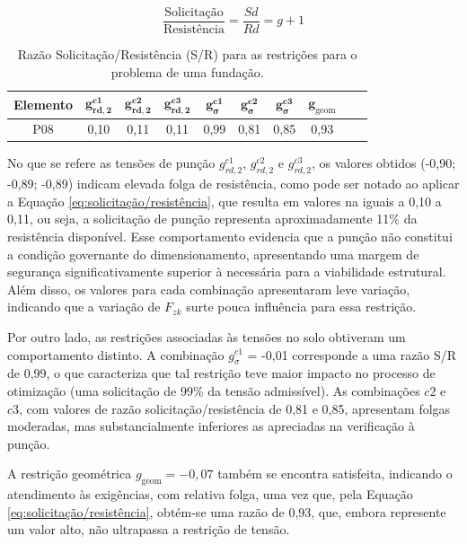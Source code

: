 \begin{equation}
    \label{eq:solicitação/resistência}
    \frac{\text{Solicitação}}{\text{Resistência}} = \frac{Sd}{Rd} = g + 1
\end{equation}

\begin{table}[htpb!]
\centering
\caption{Razão Solicitação/Resistência (S/R) para as restrições para o problema de uma fundação.}
\label{tab:S/R_uma_fundação}
\begin{tabular}{cccccccccc}
\toprule
\textbf{Elemento} &
$\mathbf{g_{rd,2}^{c1}}$ &
$\mathbf{g_{rd,2}^{c2}}$ &
$\mathbf{g_{rd,2}^{c3}}$ &
$\mathbf{g_{\sigma}^{c1}}$ &
$\mathbf{g_{\sigma}^{c2}}$ &
$\mathbf{g_{\sigma}^{c3}}$ &
$\mathbf{g_{\mathrm{geom}}}$ \\
\midrule
P08 & 0,10	& 0,11	& 0,11	& 0,99	& 0,81	& 0,85	& 0,93 \\
\bottomrule
\end{tabular}
\end{table}

No que se refere as tensões de punção $g_{rd,2}^{c1}$, $g_{rd,2}^{c2}$ e $g_{rd,2}^{c3}$, os valores obtidos (-0,90; -0,89; -0,89) indicam elevada folga de resistência, como pode ser notado ao aplicar a Equação \eqref{eq:solicitação/resistência}, que resulta em valores na iguais a 0,10 a 0,11, ou seja, a solicitação de punção representa aproximadamente 11\% da resistência disponível. Esse comportamento evidencia que a punção não constitui a condição governante do dimensionamento, apresentando uma margem de segurança significativamente superior à necessária para a viabilidade estrutural. Além disso, os valores para cada combinação apresentaram leve variação, indicando que a variação de $F_{zk}$ surte pouca influência para essa restrição. 

Por outro lado, as restrições associadas às tensões no solo obtiveram um comportamento distinto. A combinação $g_{\sigma}^{c1}$ = -0,01 corresponde a uma razão S/R de 0,99, o que caracteriza que tal restrição teve maior impacto no processo de otimização (uma solicitação de 99\% da tensão admissível). As combinações $c2$ e $c3$, com valores de razão solicitação/resistência de 0,81 e 0,85, apresentam folgas moderadas, mas substancialmente inferiores as apreciadas na verificação à punção.

A restrição geométrica $g_{\mathrm{geom}} = -0,07$ também se encontra satisfeita, indicando o atendimento às exigências, com relativa folga, uma vez que, pela Equação \eqref{eq:solicitação/resistência}, obtém-se uma razão de 0,93, que, embora represente um valor alto, não ultrapassa a restrição de tensão. 

